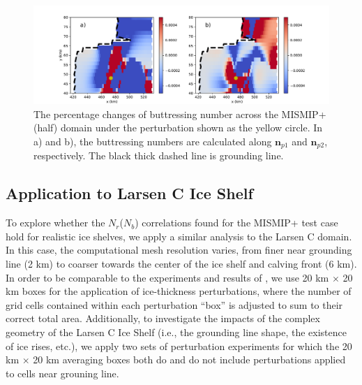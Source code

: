 \documentclass[tc, manuscript]{copernicus}
\begin{document}

\begin{figure}
	\centering
    \includegraphics[width=1\linewidth]{./figs/sigma_change_example.pdf}
    \caption{The percentage changes of buttressing number across the MISMIP+ (half) domain under the perturbation shown as the yellow circle. In a) and b), the buttressing numbers are calculated along $\mathbf{n}_{p1}$ and $\mathbf{n}_{p2}$, respectively. The black thick dashed line is grounding line.}
	\label{sigma_change_example}
\end{figure}



\subsection{Application to Larsen C Ice Shelf}

To explore whether the $N_r$($N_b$) correlations found for the MISMIP+ test case hold for realistic ice shelves, we apply a similar analysis to the Larsen C domain. In this case, the computational mesh resolution varies, from finer near grounding line (2 km) to coarser towards the center of the ice shelf and calving front (6 km). In order to be comparable to the experiments and results of \citet{reese2018}, we use 20 km $\times$ 20 km boxes for the application of ice-thickness perturbations, where the number of grid cells contained within each perturbation ``box'' is adjusted to sum to their correct total area. Additionally, to investigate the impacts of the complex geometry of the Larsen C Ice Shelf (i.e., the grounding line shape, the existence of ice rises, etc.), we apply two sets of perturbation experiments for which the 20 km $\times$ 20 km averaging boxes both do and do not include perturbations applied to cells near grouning line. %
\end{document}
